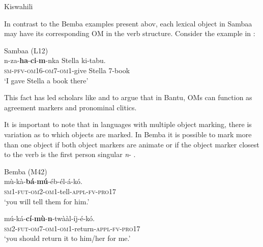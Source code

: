 \documentclass[output=paper]{langscibook}
\begin{document}
\ea\label{ex:ngunga:13}  Kiswahili\\

    \z
\z

In contrast to the Bemba examples present abov, each lexical object in Sambaa may have its corresponding OM in the verb structure. Consider the example in :

\ea\label{ex:ngunga:14}  Sambaa (L12)    \citep[72]{Riedel2009}\\
\gll n-za-\textbf{ha}{}-\textbf{ci}{}-\textbf{m}{}-nka    Stella    ki-tabu.\\
{\textsc{sm}-\textsc{pfv}-\textsc{om}16-\textsc{om}7-\textsc{om}1}{}-give  Stella    7-book\\
\glt ‘I gave Stella a book there’
\z

This fact has led scholars like \citet{Henderson2006acal} and \citet{Zeller2014} to argue that in Bantu, OMs can function as agreement markers and pronominal clitics.

It is important to note that in languages with multiple object marking, there is variation as to which objects are marked. In Bemba it is possible to mark more than one object if both object markers are animate  or if the object marker closest to the verb is the first person singular \textit{n}{}- . 

\ea\label{ex:ngunga:15}  Bemba (M42)    \citep[245]{MartenKula2012}\\
    \ea\label{ex:ngunga:15a} \gll mù-kà-\textbf{bá}-\textbf{mú}-éb-él-á-kó.\\
  {\textsc{sm}1-\textsc{fut}-\textsc{om}2-\textsc{om}1}{}-tell-{\textsc{appl}-\textsc{fv}-\textsc{pro}17}\\
  \glt ‘you will tell them for him.’     
  
  \ex\label{ex:ngunga:15b} \gll  mú-ká-\textbf{cí}-\textbf{mù}-\textbf{n}-twààl-íj-é-kó.\\
  {\textsc{sm}2-\textsc{fut}-\textsc{om}7-\textsc{om}1-\textsc{om}1}{}-return-{\textsc{appl}}{}-{\textsc{fv}-\textsc{pro}17}\\
  \glt ‘you should return it to him/her for me.’
    \z
\z
\end{document}
